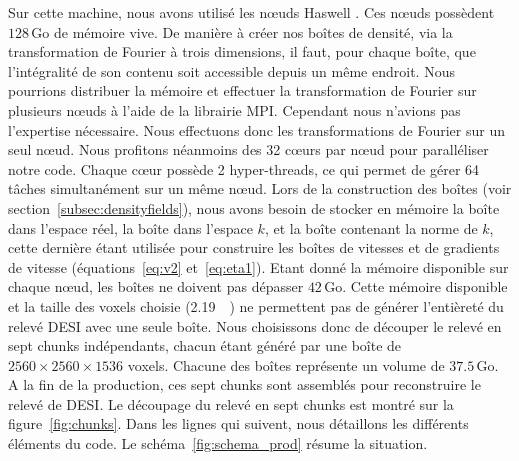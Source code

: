 Sur cette machine, nous avons utilisé les n{\oe}uds \og Haswell \fg.
Ces n{\oe}uds possèdent $\num{128}\,\mathrm{Go}$ de mémoire vive. De manière à créer nos boîtes de densité, via la transformation de Fourier à trois dimensions, il faut, pour chaque boîte, que l'intégralité de son contenu soit accessible depuis un même endroit.
Nous pourrions distribuer la mémoire et effectuer la transformation de Fourier sur plusieurs n{\oe}uds à l'aide de la librairie MPI.
Cependant nous n'avions pas l'expertise nécessaire. Nous effectuons donc les transformations de Fourier sur un seul n{\oe}ud.
Nous profitons néanmoins des \num{32} c{\oe}urs par n{\oe}ud pour paralléliser notre code. Chaque c{\oe}ur possède 2 hyper-threads, ce qui permet de gérer 64 tâches simultanément sur un même n{\oe}ud.
Lors de la construction des boîtes (voir section~\ref{subsec:densityfields}), nous avons besoin de stocker en mémoire la boîte dans l'espace réel, la boîte dans l'espace $k$, et la boîte contenant la norme de $k$, cette dernière étant utilisée pour construire les boîtes de vitesses et de gradients de vitesse (équations~\ref{eq:v2} et~\ref{eq:eta1}).
Etant donné la mémoire disponible sur chaque n{\oe}ud, les boîtes ne doivent pas dépasser $\num{42}\,\mathrm{Go}$. Cette mémoire disponible et la taille des voxels choisie (\SI{2.19}{\perh\Mpc}) ne permettent pas de générer l'entièreté du relevé DESI avec une seule boîte.
Nous choisissons donc de découper le relevé en sept chunks indépendants, chacun étant généré par une boîte de $\num{2560}\times\num{2560}\times\num{1536}$ voxels. Chacune des boîtes représente un volume de $\num{37.5}\,\mathrm{Go}$. A la fin de la production, ces sept chunks sont assemblés pour reconstruire le relevé de DESI. Le découpage du relevé en sept chunks est montré sur la figure~\ref{fig:chunks}.
Dans les lignes qui suivent, nous détaillons les différents éléments du code.
Le schéma~\ref{fig:schema_prod} résume la situation.
